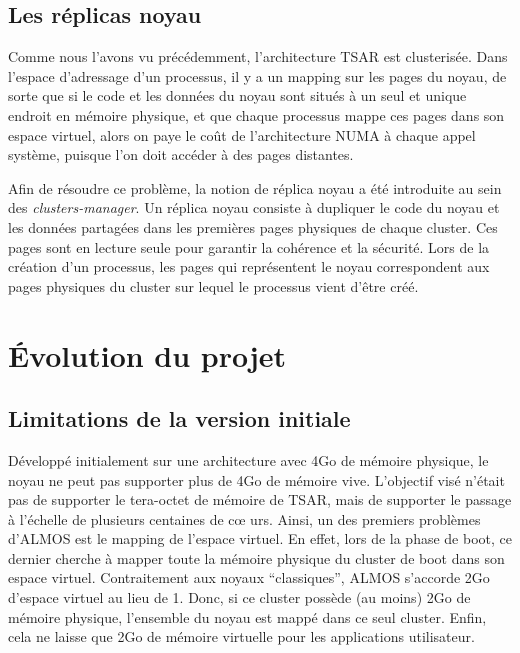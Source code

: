       
    \subsection{Les réplicas noyau}

      Comme nous l'avons vu précédemment, l'architecture TSAR est clusterisée.
      Dans l'espace d'adressage d'un processus, il y a un mapping sur les pages
      du noyau, de sorte que si le code et les données du noyau sont situés à un
      seul et unique endroit en mémoire physique, et que chaque processus mappe
      ces pages dans son espace virtuel, alors on paye le coût de l'architecture
      NUMA à chaque appel système, puisque l'on doit accéder à des pages
      distantes.

      Afin de résoudre ce problème, la notion de réplica noyau a été introduite
      au sein des \textit{clusters-manager}. Un réplica noyau consiste à
      dupliquer le code du noyau et les données partagées dans les premières
      pages physiques de chaque cluster. Ces pages sont en lecture seule pour
      garantir la cohérence et la sécurité. Lors de la création d'un processus,
      les pages qui représentent le noyau correspondent aux pages physiques du
      cluster sur lequel le processus vient d'être créé.


  \section{Évolution du projet}

    \subsection{Limitations de la version initiale}
    
      Développé initialement sur une architecture avec 4Go de mémoire physique,
      le noyau ne peut pas supporter plus de 4Go de mémoire vive. L'objectif
      visé n'était pas de supporter le tera-octet de mémoire de TSAR, mais de
      supporter le passage à l'échelle de plusieurs centaines de c\oe
      urs. Ainsi, un des premiers problèmes d'ALMOS est le mapping de l'espace
      virtuel. En effet, lors de la phase de boot, ce dernier cherche à mapper
      toute la mémoire physique du cluster de boot dans son espace
      virtuel. Contraitement aux noyaux ``classiques'', ALMOS s'accorde 2Go
      d'espace virtuel au lieu de 1. Donc, si ce cluster possède (au moins) 2Go
      de mémoire physique, l'ensemble du noyau est mappé dans ce seul
      cluster. Enfin, cela ne laisse que 2Go de mémoire virtuelle pour les
      applications utilisateur.

